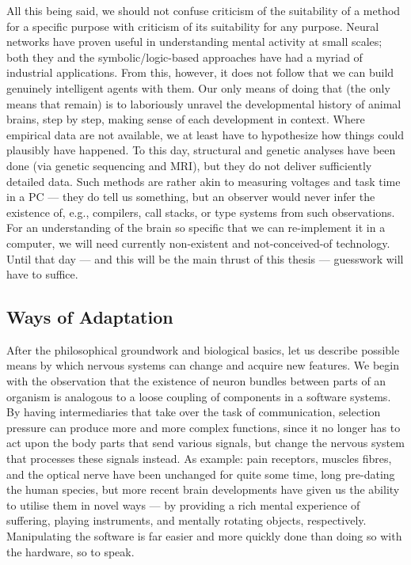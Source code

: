 All this being said, we should not confuse criticism of the suitability of a method for a specific purpose with criticism of its suitability for any purpose. Neural networks have proven useful in understanding mental activity at small scales; both they and the symbolic/logic-based approaches have had a myriad of industrial applications. From this, however, it does not follow that we can build genuinely intelligent agents with them. Our only means of doing that (the only means that remain) is to laboriously unravel the developmental history of animal brains, step by step, making sense of each development in context. Where empirical data are not available, we at least have to hypothesize how things could plausibly have happened. To this day, structural and genetic analyses have been done (via genetic sequencing and MRI), but they do not deliver sufficiently detailed data. Such methods are rather akin to measuring voltages and task time in a PC --- they do tell us something, but an observer would never infer the existence of, e.g., compilers, call stacks, or type systems from such observations. For an understanding of the brain so specific that we can re-implement it in a computer, we will need currently non-existent and not-conceived-of technology. Until that day --- and this will be the main thrust of this thesis --- guesswork will have to suffice.

\subsection{Ways of Adaptation}

After the philosophical groundwork and biological basics, let us describe possible means by which nervous systems can change and acquire new features. We begin with the observation that the existence of neuron bundles between parts of an organism is analogous to a loose coupling of components in a software systems. By having intermediaries that take over the task of communication, selection pressure can produce more and more complex functions, since it no longer has to act upon the body parts that send various signals, but change the nervous system that processes these signals instead. As example: pain receptors, muscles fibres, and the optical nerve have been unchanged for quite some time, long pre-dating the human species, but more recent brain developments have given us the ability to utilise them in novel ways --- by providing a rich mental experience of suffering, playing instruments, and mentally rotating objects, respectively. Manipulating the software is far easier and more quickly done than doing so with the hardware, so to speak.

